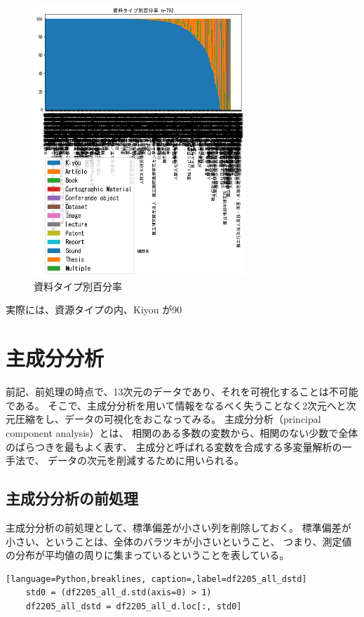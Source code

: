 \documentclass[submit,noauthor]{ono}
\begin{document}
\begin{figure}[h]
	\includegraphics[width=8cm]{./picture/percentage_sort.png}
	\caption{資料タイプ別百分率}
	\label{fig:percentage}
\end{figure}

実際には、資源タイプの内、Kiyou が90%

\section{主成分分析}
\label{PCA}
前記、前処理の時点で、13次元のデータであり、それを可視化することは不可能である。
そこで、主成分分析を用いて情報をなるべく失うことなく2次元へと次元圧縮をし、データの可視化をおこなってみる。
主成分分析（principal component analysis）とは、
相関のある多数の変数から、相関のない少数で全体のばらつきを最もよく表す、
主成分と呼ばれる変数を合成する多変量解析の一手法で、
データの次元を削減するために用いられる。

\subsection{主成分分析の前処理}
主成分分析の前処理として、標準偏差が小さい列を削除しておく。
標準偏差が小さい、ということは、全体のバラツキが小さいということ、
つまり、測定値の分布が平均値の周りに集まっているということを表している。

\begin{lstlisting}[language=Python,breaklines, caption=,label=df2205_all_dstd]
	std0 = (df2205_all_d.std(axis=0) > 1)
	df2205_all_dstd = df2205_all_d.loc[:, std0]
\end{lstlisting}
\end{document}
